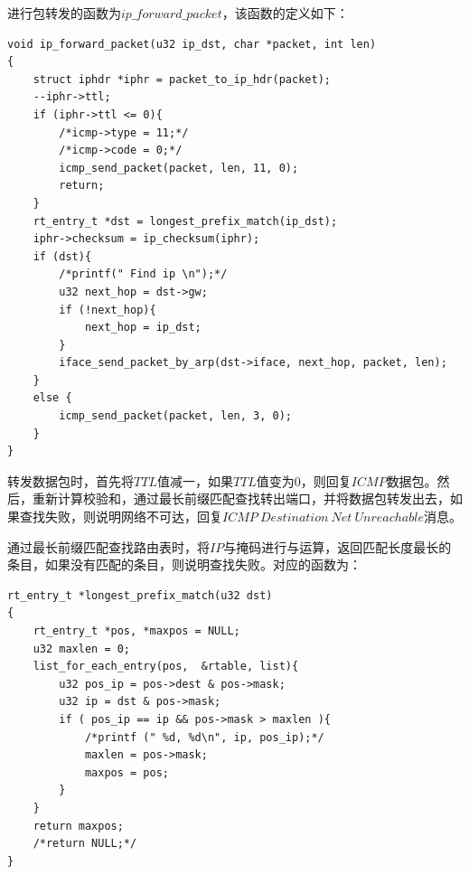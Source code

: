 \documentclass[UTF8,noindent]{ctexart}
\begin{document}
进行包转发的函数为$ip\_forward\_packet$，该函数的定义如下：
\begin{lstlisting}
void ip_forward_packet(u32 ip_dst, char *packet, int len)
{
	struct iphdr *iphr = packet_to_ip_hdr(packet);
	--iphr->ttl;
	if (iphr->ttl <= 0){
		/*icmp->type = 11;*/
		/*icmp->code = 0;*/
		icmp_send_packet(packet, len, 11, 0);
		return;
	}
	rt_entry_t *dst = longest_prefix_match(ip_dst);
	iphr->checksum = ip_checksum(iphr);
	if (dst){
		/*printf(" Find ip \n");*/
		u32 next_hop = dst->gw;
		if (!next_hop){
			next_hop = ip_dst;
		}
		iface_send_packet_by_arp(dst->iface, next_hop, packet, len);
	}
	else {
		icmp_send_packet(packet, len, 3, 0);
	}
}
\end{lstlisting}
转发数据包时，首先将$TTL$值减一，如果$TTL$值变为0，则回复$ICMP$数据包。然后，重新计算校验和，通过最长前缀匹配查找转出端口，并将数据包转发出去，如果查找失败，则说明网络不可达，回复$ICMP\ Destination\ Net\ Unreachable$消息。

通过最长前缀匹配查找路由表时，将$IP$与掩码进行与运算，返回匹配长度最长的条目，如果没有匹配的条目，则说明查找失败。对应的函数为：
\begin{lstlisting}
rt_entry_t *longest_prefix_match(u32 dst)
{
	rt_entry_t *pos, *maxpos = NULL;
	u32 maxlen = 0;
	list_for_each_entry(pos,  &rtable, list){
		u32 pos_ip = pos->dest & pos->mask;
		u32 ip = dst & pos->mask;
		if ( pos_ip == ip && pos->mask > maxlen ){
			/*printf (" %d, %d\n", ip, pos_ip);*/
			maxlen = pos->mask;
			maxpos = pos;
		}
	}
	return maxpos;
	/*return NULL;*/
}
\end{lstlisting}
\end{document}
